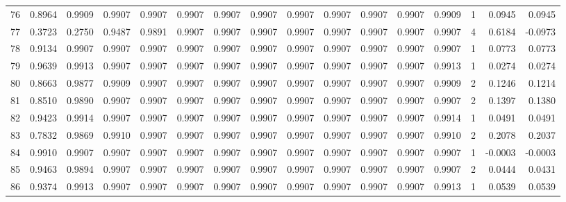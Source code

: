\begin{tabular}{lrrrrrrrrrrrrrrr}
76  &      0.8964 &  0.9909 &  0.9907 &  0.9907 &  0.9907 &  0.9907 &  0.9907 &  0.9907 &  0.9907 &  0.9907 &   0.9907 &     0.9909 &      1 &                    0.0945 &                     0.0945 \\
77  &      0.3723 &  0.2750 &  0.9487 &  0.9891 &  0.9907 &  0.9907 &  0.9907 &  0.9907 &  0.9907 &  0.9907 &   0.9907 &     0.9907 &      4 &                    0.6184 &                    -0.0973 \\
78  &      0.9134 &  0.9907 &  0.9907 &  0.9907 &  0.9907 &  0.9907 &  0.9907 &  0.9907 &  0.9907 &  0.9907 &   0.9907 &     0.9907 &      1 &                    0.0773 &                     0.0773 \\
79  &      0.9639 &  0.9913 &  0.9907 &  0.9907 &  0.9907 &  0.9907 &  0.9907 &  0.9907 &  0.9907 &  0.9907 &   0.9907 &     0.9913 &      1 &                    0.0274 &                     0.0274 \\
80  &      0.8663 &  0.9877 &  0.9909 &  0.9907 &  0.9907 &  0.9907 &  0.9907 &  0.9907 &  0.9907 &  0.9907 &   0.9907 &     0.9909 &      2 &                    0.1246 &                     0.1214 \\
81  &      0.8510 &  0.9890 &  0.9907 &  0.9907 &  0.9907 &  0.9907 &  0.9907 &  0.9907 &  0.9907 &  0.9907 &   0.9907 &     0.9907 &      2 &                    0.1397 &                     0.1380 \\
82  &      0.9423 &  0.9914 &  0.9907 &  0.9907 &  0.9907 &  0.9907 &  0.9907 &  0.9907 &  0.9907 &  0.9907 &   0.9907 &     0.9914 &      1 &                    0.0491 &                     0.0491 \\
83  &      0.7832 &  0.9869 &  0.9910 &  0.9907 &  0.9907 &  0.9907 &  0.9907 &  0.9907 &  0.9907 &  0.9907 &   0.9907 &     0.9910 &      2 &                    0.2078 &                     0.2037 \\
84  &      0.9910 &  0.9907 &  0.9907 &  0.9907 &  0.9907 &  0.9907 &  0.9907 &  0.9907 &  0.9907 &  0.9907 &   0.9907 &     0.9907 &      1 &                   -0.0003 &                    -0.0003 \\
85  &      0.9463 &  0.9894 &  0.9907 &  0.9907 &  0.9907 &  0.9907 &  0.9907 &  0.9907 &  0.9907 &  0.9907 &   0.9907 &     0.9907 &      2 &                    0.0444 &                     0.0431 \\
86  &      0.9374 &  0.9913 &  0.9907 &  0.9907 &  0.9907 &  0.9907 &  0.9907 &  0.9907 &  0.9907 &  0.9907 &   0.9907 &     0.9913 &      1 &                    0.0539 &                     0.0539 \\

\end{tabular}

